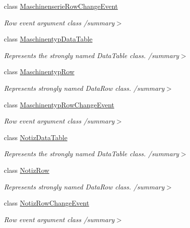 \begin{DoxyCompactItemize}
class \hyperlink{class_products_1_1_data_1_1ds_sage_1_1_maschinenserie_row_change_event}{Maschinenserie\+Row\+Change\+Event}
\begin{DoxyCompactList}\small\item\em Row event argument class /summary$>$ \end{DoxyCompactList}\item 
class \hyperlink{class_products_1_1_data_1_1ds_sage_1_1_maschinentyp_data_table}{Maschinentyp\+Data\+Table}
\begin{DoxyCompactList}\small\item\em Represents the strongly named Data\+Table class. /summary$>$ \end{DoxyCompactList}\item 
class \hyperlink{class_products_1_1_data_1_1ds_sage_1_1_maschinentyp_row}{Maschinentyp\+Row}
\begin{DoxyCompactList}\small\item\em Represents strongly named Data\+Row class. /summary$>$ \end{DoxyCompactList}\item 
class \hyperlink{class_products_1_1_data_1_1ds_sage_1_1_maschinentyp_row_change_event}{Maschinentyp\+Row\+Change\+Event}
\begin{DoxyCompactList}\small\item\em Row event argument class /summary$>$ \end{DoxyCompactList}\item 
class \hyperlink{class_products_1_1_data_1_1ds_sage_1_1_notiz_data_table}{Notiz\+Data\+Table}
\begin{DoxyCompactList}\small\item\em Represents the strongly named Data\+Table class. /summary$>$ \end{DoxyCompactList}\item 
class \hyperlink{class_products_1_1_data_1_1ds_sage_1_1_notiz_row}{Notiz\+Row}
\begin{DoxyCompactList}\small\item\em Represents strongly named Data\+Row class. /summary$>$ \end{DoxyCompactList}\item 
class \hyperlink{class_products_1_1_data_1_1ds_sage_1_1_notiz_row_change_event}{Notiz\+Row\+Change\+Event}
\begin{DoxyCompactList}\small\item\em Row event argument class /summary$>$ \end{DoxyCompactList}\item 

\end{DoxyCompactItemize}
